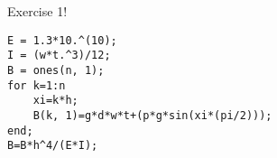 
%
Exercise 1!
%


\begin{lstlisting}
E = 1.3*10.^(10); 
I = (w*t.^3)/12; 
B = ones(n, 1);
for k=1:n
    xi=k*h; 
    B(k, 1)=g*d*w*t+(p*g*sin(xi*(pi/2)));
end;
B=B*h^4/(E*I);
  \end{lstlisting}